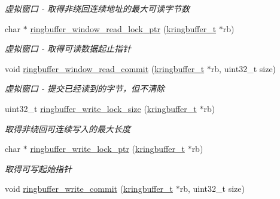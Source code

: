 \begin{DoxyCompactItemize}
\begin{DoxyCompactList}\small\item\em 虚拟窗口 -\/ 取得非绕回连续地址的最大可读字节数 \end{DoxyCompactList}\item 
char $\ast$ \hyperlink{a00087_ad11b70346a4c8b62b21b04d5b064aab4_ad11b70346a4c8b62b21b04d5b064aab4}{ringbuffer\+\_\+window\+\_\+read\+\_\+lock\+\_\+ptr} (\hyperlink{a00053_a66d91f7667db1f0b2983fc25e1a20f1c_a66d91f7667db1f0b2983fc25e1a20f1c}{kringbuffer\+\_\+t} $\ast$rb)
\begin{DoxyCompactList}\small\item\em 虚拟窗口 -\/ 取得可读数据起止指针 \end{DoxyCompactList}\item 
void \hyperlink{a00087_a97a9944a61a5323f80fb07f0fa4d8ff5_a97a9944a61a5323f80fb07f0fa4d8ff5}{ringbuffer\+\_\+window\+\_\+read\+\_\+commit} (\hyperlink{a00053_a66d91f7667db1f0b2983fc25e1a20f1c_a66d91f7667db1f0b2983fc25e1a20f1c}{kringbuffer\+\_\+t} $\ast$rb, uint32\+\_\+t size)
\begin{DoxyCompactList}\small\item\em 虚拟窗口 -\/ 提交已经读到的字节，但不清除 \end{DoxyCompactList}\item 
uint32\+\_\+t \hyperlink{a00087_aa5b19df813e8df494a77c9a849ebffdd_aa5b19df813e8df494a77c9a849ebffdd}{ringbuffer\+\_\+write\+\_\+lock\+\_\+size} (\hyperlink{a00053_a66d91f7667db1f0b2983fc25e1a20f1c_a66d91f7667db1f0b2983fc25e1a20f1c}{kringbuffer\+\_\+t} $\ast$rb)
\begin{DoxyCompactList}\small\item\em 取得非绕回可连续写入的最大长度 \end{DoxyCompactList}\item 
char $\ast$ \hyperlink{a00087_af34961f27369651af41a96f736a813af_af34961f27369651af41a96f736a813af}{ringbuffer\+\_\+write\+\_\+lock\+\_\+ptr} (\hyperlink{a00053_a66d91f7667db1f0b2983fc25e1a20f1c_a66d91f7667db1f0b2983fc25e1a20f1c}{kringbuffer\+\_\+t} $\ast$rb)
\begin{DoxyCompactList}\small\item\em 取得可写起始指针 \end{DoxyCompactList}\item 
void \hyperlink{a00087_a92305d9585adf8fe35c059b04f635d30_a92305d9585adf8fe35c059b04f635d30}{ringbuffer\+\_\+write\+\_\+commit} (\hyperlink{a00053_a66d91f7667db1f0b2983fc25e1a20f1c_a66d91f7667db1f0b2983fc25e1a20f1c}{kringbuffer\+\_\+t} $\ast$rb, uint32\+\_\+t size)

\end{DoxyCompactItemize}

